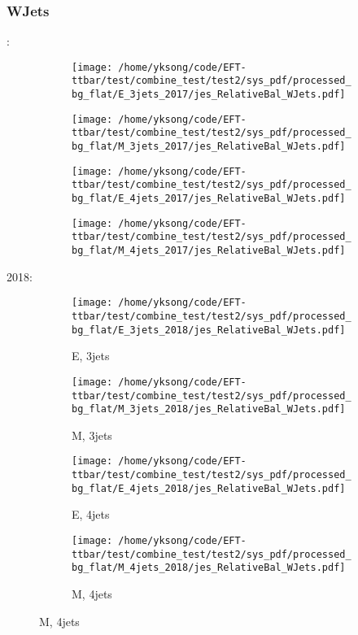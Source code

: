 \documentclass{beamer}
\begin{document}
\begin{frame}
\frametitle{WJets}
\fontsize{5}{1}:
\begin{figure}
\centering
\begin{subfigure}[b]{0.24\textwidth}
\texttt{[image: /home/yksong/code/EFT-ttbar/test/combine\_test/test2/sys\_pdf/processed\_bg\_flat/E\_3jets\_2017/jes\_RelativeBal\_WJets.pdf]}
\end{subfigure}
\begin{subfigure}[b]{0.24\textwidth}
\texttt{[image: /home/yksong/code/EFT-ttbar/test/combine\_test/test2/sys\_pdf/processed\_bg\_flat/M\_3jets\_2017/jes\_RelativeBal\_WJets.pdf]}
\end{subfigure}
\begin{subfigure}[b]{0.24\textwidth}
\texttt{[image: /home/yksong/code/EFT-ttbar/test/combine\_test/test2/sys\_pdf/processed\_bg\_flat/E\_4jets\_2017/jes\_RelativeBal\_WJets.pdf]}
\end{subfigure}
\begin{subfigure}[b]{0.24\textwidth}
\texttt{[image: /home/yksong/code/EFT-ttbar/test/combine\_test/test2/sys\_pdf/processed\_bg\_flat/M\_4jets\_2017/jes\_RelativeBal\_WJets.pdf]}
\end{subfigure}
\end{figure}
2018:
\begin{figure}
\centering
\begin{subfigure}[b]{0.24\textwidth}
\texttt{[image: /home/yksong/code/EFT-ttbar/test/combine\_test/test2/sys\_pdf/processed\_bg\_flat/E\_3jets\_2018/jes\_RelativeBal\_WJets.pdf]}
\captionsetup{font=tiny}
\caption{E, 3jets}
\end{subfigure}
\begin{subfigure}[b]{0.24\textwidth}
\texttt{[image: /home/yksong/code/EFT-ttbar/test/combine\_test/test2/sys\_pdf/processed\_bg\_flat/M\_3jets\_2018/jes\_RelativeBal\_WJets.pdf]}
\captionsetup{font=tiny}
\caption{M, 3jets}
\end{subfigure}
\begin{subfigure}[b]{0.24\textwidth}
\texttt{[image: /home/yksong/code/EFT-ttbar/test/combine\_test/test2/sys\_pdf/processed\_bg\_flat/E\_4jets\_2018/jes\_RelativeBal\_WJets.pdf]}
\captionsetup{font=tiny}
\caption{E, 4jets}
\end{subfigure}
\begin{subfigure}[b]{0.24\textwidth}
\texttt{[image: /home/yksong/code/EFT-ttbar/test/combine\_test/test2/sys\_pdf/processed\_bg\_flat/M\_4jets\_2018/jes\_RelativeBal\_WJets.pdf]}
\captionsetup{font=tiny}
\caption{M, 4jets}
\end{subfigure}
\end{figure}
\end{frame}
\end{document}
